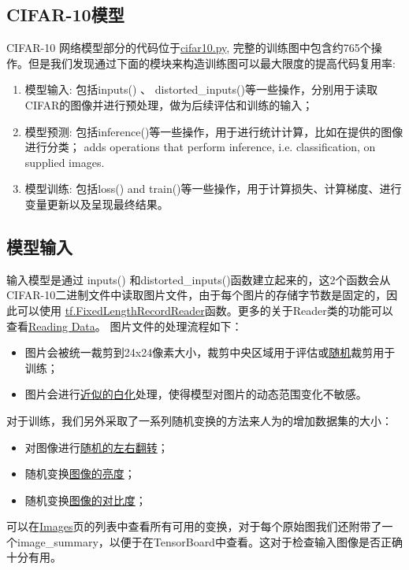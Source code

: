 \subsection{CIFAR-10模型}
CIFAR-10 网络模型部分的代码位于\href{https://www.tensorflow.org/code/tensorflow_models/tutorials/image/cifar10/cifar10.py}{cifar10.py}, 完整的训练图中包含约765个操作。但是我们发现通过下面的模块来构造训练图可以最大限度的提高代码复用率:
\begin{enumerate}
	\item 模型输入: 包括inputs() 、 distorted\_inputs()等一些操作，分别用于读取CIFAR的图像并进行预处理，做为后续评估和训练的输入；
	\item 模型预测: 包括inference()等一些操作，用于进行统计计算，比如在提供的图像进行分类； adds operations that perform inference, i.e. classification, on supplied images.
	\item 模型训练: 包括loss() and train()等一些操作，用于计算损失、计算梯度、进行变量更新以及呈现最终结果。
\end{enumerate}
\subsection{模型输入}
输入模型是通过 inputs() 和distorted\_inputs()函数建立起来的，这2个函数会从CIFAR-10二进制文件中读取图片文件，由于每个图片的存储字节数是固定的，因此可以使用
\href{https://www.tensorflow.org/api_docs/python/tf/FixedLengthRecordReader}{tf.FixedLengthRecordReader}函数。更多的关于Reader类的功能可以查看\href{https://www.tensorflow.org/api_guides/python/reading_data#reading_from_files}{Reading Data}。
图片文件的处理流程如下：
\begin{itemize}
	\item 图片会被统一裁剪到24x24像素大小，裁剪中央区域用于评估或\href{https://www.tensorflow.org/api_docs/python/tf/random_crop}{随机}裁剪用于训练；
	\item 图片会进行\href{https://www.tensorflow.org/api_docs/python/tf/image/per_image_standardization}{近似的白化}处理，使得模型对图片的动态范围变化不敏感。
\end{itemize}
对于训练，我们另外采取了一系列随机变换的方法来人为的增加数据集的大小：
\begin{itemize}
	\item 对图像进行\href{https://www.tensorflow.org/api_docs/python/tf/image/random_flip_left_right}{随机的左右翻转}；
	\item 随机变换\href{https://www.tensorflow.org/api_docs/python/tf/image/random_brightness}{图像的亮度}；
	\item 随机变换\href{https://www.tensorflow.org/api_docs/python/tf/image/random_contrast}{图像的对比度}；
\end{itemize}
可以在\href{https://www.tensorflow.org/api_guides/python/image}{Images}页的列表中查看所有可用的变换，对于每个原始图我们还附带了一个image\_summary，以便于在TensorBoard中查看。这对于检查输入图像是否正确十分有用。

